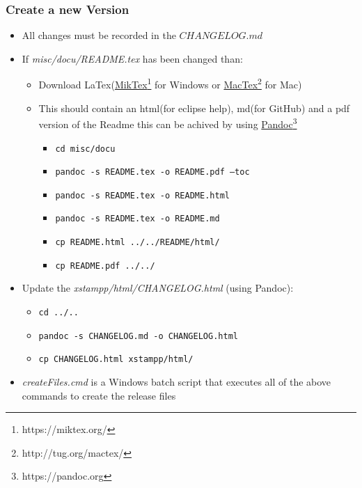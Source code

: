\subsubsection{Create a new Version} 
\begin{itemize}
\item All changes must be recorded in the $CHANGELOG.md$
\item If \textit{misc/docu/README.tex} has been changed than:
	\begin{itemize}
	\item Download LaTex(\href{https://miktex.org/}{MikTex}\footnote{https://miktex.org/} for Windows or \href{http://tug.org/mactex/}{MacTex}\footnote{http://tug.org/mactex/} for Mac)
	\item This should contain an html(for eclipse help), md(for GitHub) and a pdf version of the Readme this can be achived by using \href{https://pandoc.org}{Pandoc}\footnote{https://pandoc.org}
		\begin{itemize}
		\item \texttt{cd misc/docu}
		\item \texttt{pandoc -s README.tex -o README.pdf --toc}
		\item \texttt{pandoc -s README.tex -o README.html}
		\item \texttt{pandoc -s README.tex -o README.md}
		\item \texttt{cp README.html ../../README/html/}
		\item \texttt{cp README.pdf ../../}
		\end{itemize}
	\end{itemize}
\item Update the \textit{xstampp/html/CHANGELOG.html} (using Pandoc):
	\begin{itemize}
		\item \texttt{cd ../..}
		\item \texttt{pandoc -s CHANGELOG.md -o CHANGELOG.html}
		\item \texttt{cp CHANGELOG.html xstampp/html/}
	\end{itemize}
	\item \textit{createFiles.cmd} is a Windows batch script that executes all of the above commands to create the release files
\end{itemize}